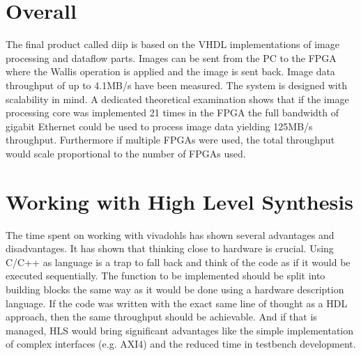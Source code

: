 %
%
\section{Overall}
The final product called \gls{diip} is based on the VHDL implementations of
image processing and dataflow parts. Images can be sent from the PC to the FPGA
where
the Wallis operation is applied and the image is sent back. Image data
throughput of up to 4.1MB/s have been measured. The system is designed with
scalability in mind. A dedicated theoretical examination shows that if the
image processing core was implemented 21 times in the FPGA the full bandwidth of
gigabit Ethernet could be used to process image data yielding 125MB/s
throughput. Furthermore if multiple FPGAs were used, the total throughput would
scale proportional to the number of FPGAs used.

%
%
\section{Working with High Level Synthesis}
The time spent on working with \gls{vivadohls} has shown several advantages and
disadvantages. It has shown that thinking close to hardware is crucial. Using
C/C++ as language is a trap to fall back and think of the code as if it would be
executed sequentially. The function to be implemented should be split into
building blocks the same way as it would be done using a hardware description
language. If the code was written with the exact same line of thought as a HDL
approach, then the same throughput should be achievable. And if that is managed,
HLS would bring significant advantages like the simple implementation of complex
interfaces (e.g. AXI4) and the reduced time in testbench development.

%
%
